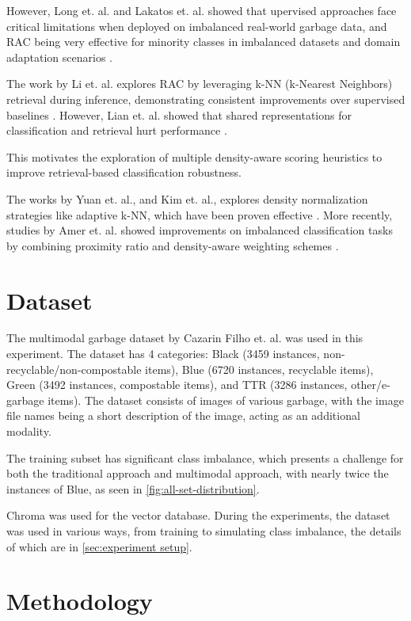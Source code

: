 \documentclass{article}
\begin{document}
However, Long et. al. and Lakatos et. al. showed that upervised approaches face critical limitations when deployed on imbalanced real-world garbage data, and RAC being very effective for minority classes in imbalanced datasets and domain adaptation scenarios \cite{long2022retrieval, lakatos2025investigating}.

The work by Li et. al. explores RAC by leveraging k-NN (k-Nearest Neighbors) retrieval during inference, demonstrating consistent improvements over supervised baselines \cite{li2024kra}. However, Lian et. al. showed that shared representations for classification and retrieval hurt performance \cite{liang2023retrieval}.

This motivates the exploration of multiple density-aware scoring heuristics to improve retrieval-based classification robustness.

The works by Yuan et. al., and Kim et. al., explores density normalization strategies like adaptive k-NN, which have been proven effective \cite{yuan2021novel,kim2021normalized}. More recently, studies by Amer et. al. showed improvements on imbalanced classification tasks by combining proximity ratio and density-aware weighting schemes \cite{amer2025effective}.


\section{Dataset}

The multimodal garbage dataset by Cazarin Filho et. al. \cite{cazarin2025garbage} was used in this experiment. The dataset has 4 categories: Black (3459 instances, non-recyclable/non-compostable items), Blue (6720 instances, recyclable items), Green (3492 instances, compostable items), and TTR (3286 instances, other/e-garbage items). The dataset consists of images of various garbage, with the image file names being a short description of the image, acting as an additional modality.

The training subset has significant class imbalance, which presents a challenge for both the traditional approach and multimodal approach, with nearly twice the instances of Blue, as seen in \autoref{fig:all-set-distribution}.  

Chroma \cite{chromadb} was used for the vector database. During the experiments, the dataset was used in various ways, from training to simulating class imbalance, the details of which are in \autoref{sec:experiment setup}.


\section{Methodology}
\label{sec:methodology}
\end{document}
